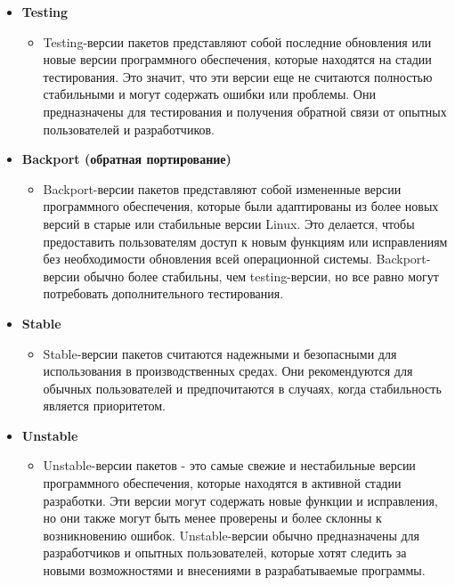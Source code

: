 \documentclass[oneside, final, 14pt]{extreport} %
\begin{document}
\begin{itemize}

    \item \textbf{Testing}
            \begin{itemize}
            \item Testing-версии пакетов представляют собой последние обновления или новые версии программного обеспечения, которые находятся на стадии тестирования. Это значит, что эти версии еще не считаются полностью стабильными и могут содержать ошибки или проблемы. Они предназначены для тестирования и получения обратной связи от опытных пользователей и разработчиков.
            \end{itemize}
    \item \textbf{Backport (обратная портирование)}
            \begin{itemize}
                \item Backport-версии пакетов представляют собой измененные версии программного обеспечения, которые были адаптированы из более новых версий в старые или стабильные версии Linux. Это делается, чтобы предоставить пользователям доступ к новым функциям или исправлениям без необходимости обновления всей операционной системы. Backport-версии обычно более стабильны, чем testing-версии, но все равно могут потребовать дополнительного тестирования.
            \end{itemize}
    \item \textbf{Stable}
            \begin{itemize}
                \item Stable-версии пакетов считаются надежными и безопасными для использования в производственных средах. Они рекомендуются для обычных пользователей и предпочитаются в случаях, когда стабильность является приоритетом.
            \end{itemize}
    \item \textbf{Unstable}
            \begin{itemize}
                \item Unstable-версии пакетов - это самые свежие и нестабильные версии программного обеспечения, которые находятся в активной стадии разработки. Эти версии могут содержать новые функции и исправления, но они также могут быть менее проверены и более склонны к возникновению ошибок. Unstable-версии обычно предназначены для разработчиков и опытных пользователей, которые хотят следить за новыми возможностями и внесениями в разрабатываемые программы.
            \end{itemize}
\end{itemize}
\end{document}

